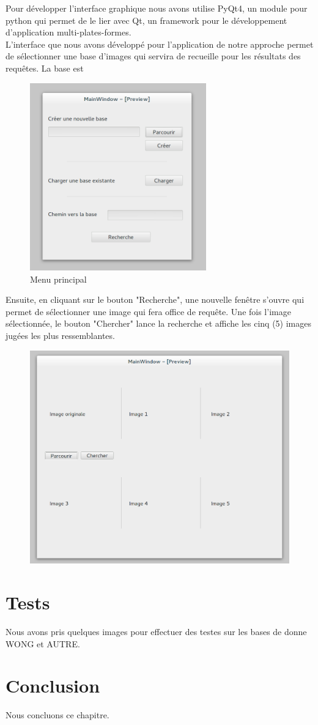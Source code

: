 Pour développer l'interface graphique nous avons utilise PyQt4, un module pour python qui permet de le lier avec Qt, un framework pour le développement d'application multi-plates-formes.\\

L'interface que nous avons développé pour l'application de notre approche permet de sélectionner une base d'images qui servira de recueille pour les résultats des requêtes. La base est 


\begin{figure}[H]
	\centering
		\includegraphics[width=3in]{Figures/mainMenu.png}
	\caption[Menu principal]{Menu principal}
	\label{fig:Electron}
\end{figure}


Ensuite, en cliquant sur le bouton "Recherche", une nouvelle fenêtre s'ouvre qui permet de sélectionner une image qui fera office de requête. Une fois l'image sélectionnée, le bouton "Chercher" lance la recherche et affiche les cinq (5) images jugées les plus ressemblantes. 


\begin{figure}[H]
	\centering
		\includegraphics[width=5in]{Figures/search.png}
	\caption[]{}
	\label{fig:Electron}
\end{figure}

\section{Tests}

Nous avons pris quelques images pour effectuer des testes sur les bases de donne WONG et AUTRE.

\section{Conclusion}

Nous concluons ce chapitre.
